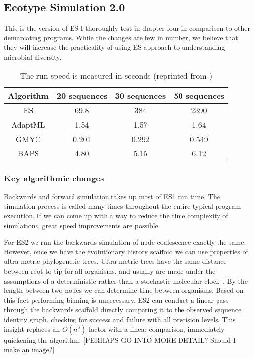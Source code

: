 \subsection*{Ecotype Simulation 2.0}
This is the version of ES I thoroughly test in chapter four in comparison to other demarcating programs.
While the changes are few in number, we believe that they will increase the practicality of using ES approach to understanding microbial diversity.

\begin{table}
 \begin{tabular}{| c | c | c | c |}
  \hline
  Algorithm & 20 sequences & 30 sequences & 50 sequences \\ \hline
  ES & 69.8 & 384 & 2390 \\
  AdaptML & 1.54 & 1.57 & 1.64 \\
  GMYC & 0.201 & 0.292 & 0.549 \\
  BAPS & 4.80 & 5.15 & 6.12 \\
  \hline
 \end{tabular}
 \caption[ES1 run-time compared to other demarcation programs.]{The run speed is measured in seconds (reprinted from \protect\cite{carlo})}
 \label{tab:ES1speed}
\end{table}

\subsubsection*{Key algorithmic changes}
Backwards and forward simulation takes up most of ES1 run time.
The simulation process is called many times throughout the entire typical program execution.
If we can come up with a way to reduce the time complexity of simulations, great speed improvements are possible.

For ES2 we run the backwards simulation of node coalescence exactly the same.
However, once we have the evolutionary history scaffold we can use properties of ultra-metric phylogenetic trees.
Ultra-metric trees have the same distance between root to tip for all organisms, and usually are made under the assumptions of a deterministic rather than a stochastic molecular clock~\cite{ho2008molecular}.
By the length between two nodes we can determine time between organisms.
Based on this fact performing binning is unnecessary.
ES2 can conduct a linear pass through the backwards scaffold directly comparing it to the observed sequence identity graph, checking for success and failure with all precision levels.
This insight replaces an $O(n^3)$ factor with a linear comparison, immediately quickening the algorithm. [PERHAPS GO INTO MORE DETAIL? Should I make an image?]

